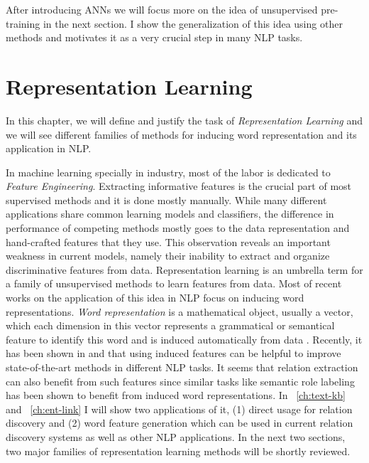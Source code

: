 After introducing ANNs we will focus more on the idea of unsupervised
pre-training in the next section. I show the generalization of this idea using
other methods and motivates it as a very crucial step in many NLP tasks.

\section{Representation Learning}
\label {sec:repr-learning}

In this chapter, we will define and justify the task of
\emph{Representation Learning} and we will see different families of methods for
inducing word representation and its application in NLP.

In machine learning specially in industry, most of the labor is dedicated to
\emph{Feature Engineering}. Extracting informative features is the crucial part
of most supervised methods and it is done mostly manually. While many different
applications share common learning models and classifiers, the difference in
performance of competing methods mostly goes to the data representation and
hand-crafted features that they use. This observation reveals an important
weakness in current models, namely their inability to extract and organize
discriminative features from data. Representation learning is an umbrella term
for a family of unsupervised methods to learn features from data. Most of recent
works on the application of this idea in NLP focus on inducing word
representations. \emph{Word representation} is a mathematical object, usually a
vector, which each dimension in this vector represents a grammatical or
semantical feature to identify this word and is induced automatically from data
\cite{Turian2010b}. Recently, it has been shown in \cite{Turian2010b} and \cite{Collobert2011} that using
 induced features can be helpful to improve state-of-the-art methods in 
different NLP tasks. It seems that relation extraction can also benefit from such features since similar tasks like 
semantic role labeling has been shown to benefit from
induced word representations. In ~\autoref{ch:text-kb} and
~\autoref{ch:ent-link} I will show two applications of it, (1) direct usage for relation discovery and
(2) word feature generation which can be used in current relation discovery
systems as well as other NLP applications.
In the next two sections, two major families of representation learning methods
will be shortly reviewed.

